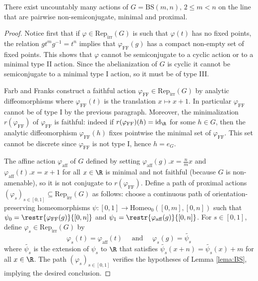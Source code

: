 \documentclass[reqno]{amsart}
\begin{document}
\begin{prop}
There exist uncountably many actions of $G = \mathrm{BS}(m,n),\, 2 \leq m < n$ on the line that are pairwise non-semiconjugate, minimal and proximal.
\end{prop}
\begin{proof}
Notice first that if $\varphi \in \mathrm{Rep}_\mathrm{irr}(G)$ is such that $\varphi(t)$ has no fixed points, the relation $gt^mg^{-1} = t^n$ implies that $\varphi_\mathrm{FF}(g)$ has a compact non-empty set of fixed points. This shows that $\varphi$ cannot be semiconjugate to a cyclic action or to a minimal type II action. Since the abelianization of $G$ is cyclic it cannot be semiconjugate to a minimal type I action, so it must be of type III.

Farb and Franks \cite[Theorem 1.5]{FarbFranks2020} construct a faithful action $\varphi_\mathrm{FF} \in \mathrm{Rep}_\mathrm{irr}(G)$ by analytic diffeomorphisms where $\varphi_\mathrm{FF}(t)$ is the translation $x \mapsto x + 1$. In particular $\varphi_\mathrm{FF}$ cannot be of type I by the previous paragraph. Moreover, the minimalization $r(\varphi_\mathrm{FF})$ of $\varphi_\mathrm{FF}$ is faithful: indeed if $r(\varphi_\mathrm{FF})(h)=\mathrm{id}_\R$ for some $h\in G$, then the analytic diffeomorphism $\varphi_\mathrm{FF}(h)$ fixes pointwise the minimal set of $\varphi_\mathrm{FF}$. This set cannot be discrete since $\varphi_\mathrm{FF}$ is not type I, hence $h=e_G$.

The affine action $\varphi_\mathrm{aff}$ of $G$ defined by setting  $\varphi_\mathrm{aff}(g).x = \frac{n}{m}x$ and $\varphi_\mathrm{aff}(t).x = x + 1$ for all $x \in \R$ is minimal and not faithful (because $G$ is non-amenable), so it is not conjugate to $r(\varphi_\mathrm{FF})$. Define a path of proximal actions $(\varphi_s)_{s \in [0,1]} \subseteq \mathrm{Rep}_\mathrm{irr}(G)$ as follows: choose a continuous path of orientation-preserving homeomorphisms $\psi \colon [0,1] \to \mathrm{Homeo}_0([0,m],[0,n])$ such that $\psi_0 = \restr{\varphi_ \mathrm{FF}(g)}{[0,n]}$ and $\psi_{1} = \restr{\varphi_\mathrm{aff}(g)}{[0,n]}$. For $s \in [0, 1]$, define $\varphi_s \in \mathrm{Rep}_\mathrm{irr}(G)$ by
\[
    \varphi_s(t) = \varphi_\mathrm{aff}(t)\quad \text{ and } \quad \varphi_s(g) = \widetilde{\psi_s}
\] where $\widetilde{\psi_s}$ is the extension of $\psi_s$ to $\R$ that satisfies $\widetilde{\psi_s}(x + n) = \widetilde{\psi_s}(x) + m$ for all $x \in \R$. The path $(\varphi_s)_{s \in [0,1]}$ verifies the hypotheses of Lemma \ref{lema:BS}, implying the desired conclusion.
\end{proof}
\end{document}
